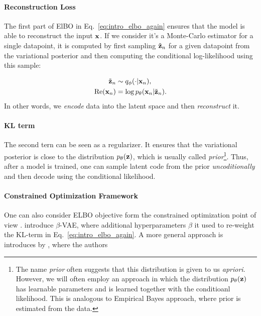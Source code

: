 \paragraph{Reconstruction Loss}
The first part of ElBO in Eq.~\ref{eq:intro_elbo_again} ensures that the model is able to reconstruct the input ${\mathbf{x}}$. If we consider it's a Monte-Carlo estimator for a single datapoint, it is computed by first sampling $\tilde{{\mathbf{z}}}_n$ for a given datapoint from the variational posterior and then computing the conditional log-likelihood using this sample:


\begin{equation}
\begin{aligned}
    \tilde{{\mathbf{z}}}_n &\sim q_{\phi}(\cdot|{\mathbf{x}}_n), \\
    \text{Re}({\mathbf{x}}_n) &= \log p_{\theta}({\mathbf{x}}_n|\tilde{{\mathbf{z}}}_n).
    \end{aligned}
\end{equation}
In other words, we \textit{encode} data into the latent space and then \textit{reconstruct} it. 

\paragraph{KL term}

The second tern can be seen as a regularizer. It ensures that the variational posterior is close to the distribution $p_{\theta}({\mathbf{z}})$, which is usually called \textit{prior}\footnote{
The name \textit{prior} often suggests that this distribution is given to us \textit{apriori}. However, we will often employ an approach in which the distribution $p_{\theta}({\mathbf{z}})$ has learnable parameters and is learned together with the conditioanl likelihood. This is analogous to Empirical Bayes \cite{wang2019comment} approach, where prior is estimated from the data. 
}. 
Thus, after a model is trained, one can sample latent code from the prior \textit{uncoditionally} and then decode using the conditional likelihood. 

\paragraph{Constrained Optimization Framework}
One can also consider ELBO objective form the constrained optimization point of view \citep{higgins2017beta, rezende2018taming}. \citet{higgins2017beta} introduce $\beta$-VAE, where additional hyperparameters $\beta$ it used to re-weight the KL-term in Eq.~\ref{eq:intro_elbo_again}. A more general approach is introduces by \citet{rezende2018taming}, where the authors 


